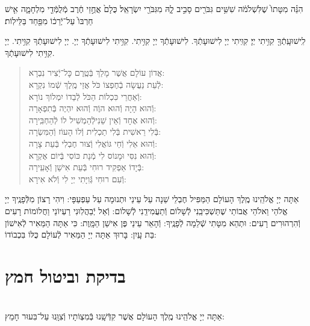 \documentclass[twoside, openany, parskip=half, 11pt]{book}
\begin{document}
הִנֵּ֗ה מִטָּתוֹ֙ שֶׁלִּשְׁלֹמֹ֔ה שִׁשִּׁ֥ים גִּבֹּרִ֖ים סָבִ֣יב לָ֑הּ מִגִּבֹּרֵ֖י יִשְׂרָאֵֽל׃ כֻּלָם֙ אֲחֻ֣זֵי חֶ֔רֶב מְֿלֻמְּֿדֵ֖י מִלְחָמָ֑ה אִ֤ישׁ חַרְבּוֹ֙ עַל־יְֿרֵכ֔וֹ מִפַּ֖חַד בַּלֵּילֽוֹת׃


לִֽישׁוּעָֽתְֿךָ֖ קִוִּ֥יתִי יְיָ׃ קִוִּֽיתִי יְיָ לִישׁוּעָתְֿךָ. לִישׁוּעָתְֿךָ יְיָ קִוִּ֥יתִי. קִוִּ֥יתִי לִישׁוּעָתְֿךָ יְיָ. יְיָ לִישׁוּעָתְֿךָ קִוִּ֥יתִי. יְיָ קִוִּ֥יתִי לִישׁוּעָתְֿךָ.

\vspace{-\baselineskip}
\begin{quote}
	
	אֲדוֹן עוֹלָם אֲשֶׁר מָלַךְ \hfill בְּֿטֶֽרֶם כׇּל־יְֿצִיר נִבְרָא:\\
	לְֿעֵת נַעֲשָׂה בְֿחֶפְצוֹ כֹּל \hfill אֲזַי מֶֽלֶךְ שְֿׁמוֹ נִקְרָא:\\
	וְֿאַחֲרֵי כִּכְלוֹת הַכֹּל \hfill לְֿבַדוֹ יִמְלוֹךְ נוֹרָא:\\
	וְֿהוּא הָיָה וְֿהוּא הוֶֹה \hfill וְֿהוּא יִהְיֶה בְּֿתִפְאָרָה:\\
	וְֿהוּא אֶחָד וְֿאֵין שֵׁנִי\hfill לְֿהַמְשִׁיל לוֹ לְֿהַחְבִּֽירָה:\\
	בְּֿלִי רֵאשִׁית בְּֿלִי תַכְלִית \hfill וְֿלוֹ הָעוֹז וְֿהַמִּשְׂרָה:\\
	וְֿהוּא אֵלִי וְֿחַי גּוֹאֲלִי \hfill וְֿצוּר חֶבְלִי בְּֿעֵת צָרָה:\\
	וְֿהוּא נִסִּי וּמָנוֹס לִי \hfill מְֿנָת כּוֹסִי בְּֿיוֹם אֶקְרָא:\\
	בְּֿיָדוֹ אַפְקִיד רוּחִי \hfill בְּֿעֵת אִישַׁן וְֿאָעִֽירָה:\\
	וְֿעִם רוּחִי גְּֿוִיָּתִי \hfill יְיָ לִי וְֿלֹא אִירָא:
	
\end{quote}


אַתָּה יְיָ אֱלֹהֵֽינוּ מֶֽלֶךְ הָעוֹלָם הַמַּפִּיל חֶבְלֵי שֵׁנָה עַל עֵינַי וּתְנוּמָה עַל עַפְעַפָּי: וִיהִי רָצוֹן מִלְּֿפָנֶֽיךָ יְיָ אֱלֹהַי וֵאלֹהֵי אֲבוֹתַי שֶׁתַּשְׁכִּיבֵֽנִי לְֿשָׁלוֹם וְֿתַעֲמִידֵֽנִי לְֿשָׁלוֹם: וְֿאַל יְֿבַהֲלֽוּנִי רַעְיוֹנַי וַחֲלוֹמוֹת רָעִים וְֿהִרְהוּרִים רָעִים: וּתְהֵא מִטָּתִי שְֿׁלֵמָה לְֿפָנֶֽיךָ: וְֿהָאֵר עֵינַי פֶּן אִישַׁן הַמָּֽוֶת: כִּי אַתָּה הַמֵּאִיר לְֿאִישׁוֹן בַּת עָֽיִן: בָּרוּךְ אַתָּה יְיָ הַמֵּאִיר לְֿעוֹלָם כֻּלּוֹ בִּכְבוֹדוֹ:


\chapter[בדיקת וביטול חמץ]{ בדיקת וביטול חמץ }

\\
אַתָּה יְיָ אֱלֹהֵֽינוּ מֶֽלֶךְ הָעוֹלָם אֲשֶׁר קִדְּֿשָֽׁנוּ בְּֿמִצְוֹתָיו וְֿצִוָּֽנוּ עַל־בִּעוּר חָמֵץ:
\end{document}
